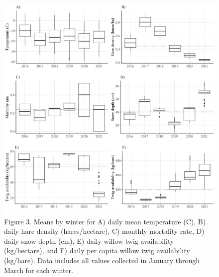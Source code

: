 \documentclass[
]{article}
\begin{document}
\begin{figure}
\centering
\includegraphics{Output/Figures/env_summary_figure1.jpeg}
\caption{Figure 3. Means by winter for A) daily mean temperature (C), B)
daily hare density (hares/hectare), C) monthly mortality rate, D) daily
snow depth (cm), E) daily willow twig availability (kg/hectare), and F)
daily per capita willow twig availability (kg/hare). Data includes all
values collected in January through March for each winter.}
\end{figure}
\end{document}

